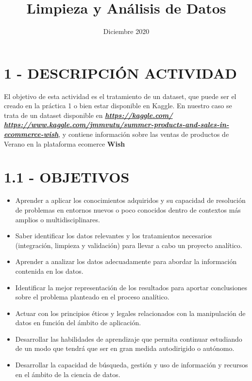 \documentclass[
]{article}
\title{Limpieza y Análisis de Datos}
\author{}
\date{\vspace{-2.5em}Diciembre 2020}
\begin{document}
\maketitle

{
\setcounter{tocdepth}{4}
\tableofcontents
}
\hypertarget{descripciuxf3n-actividad}{%
\section{1 - DESCRIPCIÓN ACTIVIDAD}\label{descripciuxf3n-actividad}}

El objetivo de esta actividad es el tratamiento de un dataset, que puede
ser el creado en la práctica 1 o bien estar disponible en Kaggle. En
nuestro caso se trata de un dataset disponible en
\textbf{\emph{\url{https://kaggle.com/}
\url{https://www.kaggle.com/jmmvutu/summer-products-and-sales-in-ecommerce-wish}}},
y contiene información sobre las ventas de productos de Verano en la
plataforma ecomerce \textbf{Wish}

\hypertarget{objetivos}{%
\section{1.1 - OBJETIVOS}\label{objetivos}}

\begin{itemize}
\item
  Aprender a aplicar los conocimientos adquiridos y su capacidad de
  resolución de problemas en entornos nuevos o poco conocidos dentro de
  contextos más amplios o multidisciplinares.
\item
  Saber identificar los datos relevantes y los tratamientos necesarios
  (integración, limpieza y validación) para llevar a cabo un proyecto
  analítico.
\item
  Aprender a analizar los datos adecuadamente para abordar la
  información contenida en los datos.
\item
  Identificar la mejor representación de los resultados para aportar
  conclusiones sobre el problema planteado en el proceso analítico.
\item
  Actuar con los principios éticos y legales relacionados con la
  manipulación de datos en función del ámbito de aplicación.
\item
  Desarrollar las habilidades de aprendizaje que permita continuar
  estudiando de un modo que tendrá que ser en gran medida autodirigido o
  autónomo.
\item
  Desarrollar la capacidad de búsqueda, gestión y uso de información y
  recursos en el ámbito de la ciencia de datos.
\end{itemize}
\end{document}
